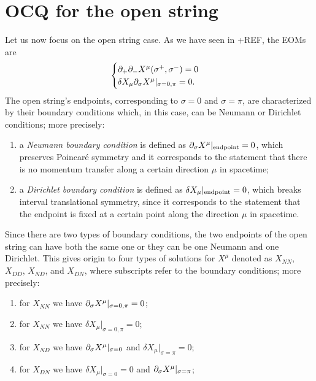 \section{OCQ for the open string}
Let us now focus on the open string case. As we have seen in +REF, the EOMs are 
\begin{equation}
    \begin{cases}
        \partial_+\partial_-X^\mu(\sigma^+,\sigma^-) = 0 \\
        \delta X_\mu\partial_\sigma X^\mu|_{\sigma = 0,\pi} = 0.
    \end{cases}
\end{equation}
The open string's endpoints, corresponding to $\sigma = 0$ and $\sigma = \pi$, are characterized by their boundary conditions which, in this case, can be Neumann or Dirichlet conditions; more precisely:
\begin{enumerate}
    \item a \emph{Neumann boundary condition} is defined as $\partial_\sigma X^\mu|_{\mathrm{endpoint}} = 0$, which preserves Poincaré symmetry and it corresponds to the statement that there is no momentum transfer along a certain direction $\mu$ in spacetime;
    \item a \emph{Dirichlet boundary condition} is defined as $\delta X_\mu|_{\mathrm{endpoint}} = 0$, which breaks interval translational symmetry, since it  corresponds to the statement that the endpoint is fixed at a certain point along the direction $\mu$ in spacetime.
\end{enumerate}
Since there are two types of boundary conditions, the two endpoints of the open string can have both the same one or they can be one Neumann and one Dirichlet. This gives origin to four types of solutions for $X^\mu$ denoted as $X_{NN}$, $X_{DD}$, $X_{ND}$, and $X_{DN}$, where subscripts refer to the boundary conditions; more precisely:
\begin{enumerate}
    \item for $X_{NN}$ we have $\partial_\sigma X^\mu|_{\sigma = 0,\pi} = 0$;
    \item for $X_{NN}$ we have $\delta X_\mu|_{\sigma = 0,\pi} = 0$;
    \item for $X_{ND}$ we have $\partial_\sigma X^\mu|_{\sigma = 0}$ and $\delta X_\mu|_{\sigma = \pi} = 0$;
    \item for $X_{DN}$ we have $\delta X_\mu|_{\sigma = 0} = 0$ and $\partial_\sigma X^\mu|_{\sigma = \pi}$;
\end{enumerate}

